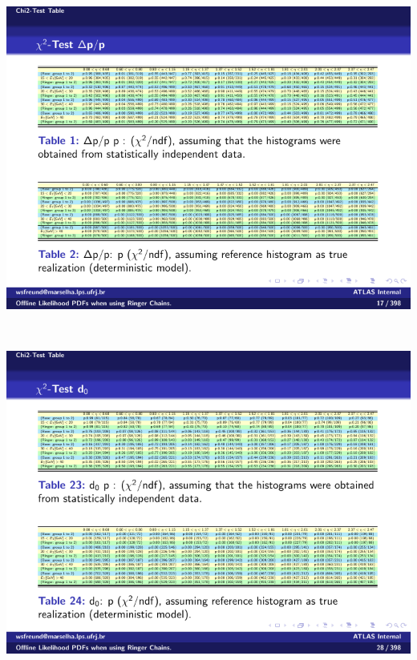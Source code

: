 \begin{table}[t]\ContinuedFloat\addtocounter{table}{-1}
\begin{subtable}{\textwidth}
\caption{\deltapoverp{}\label{tab:p_values_poverp}}
\includegraphics[width=\textwidth]{appendices/figures/homogeneity/deltapoverp_homogeneity_table.pdf}
\end{subtable} \\
\begin{subtable}{\textwidth}
\caption{\trackdO{}\label{tab:p_values_d0}}
\includegraphics[width=\textwidth]{appendices/figures/homogeneity/d0_homogeneity_table.pdf}
\end{subtable} \\
\begin{subtable}{\textwidth}

\end{subtable}
\end{table}
